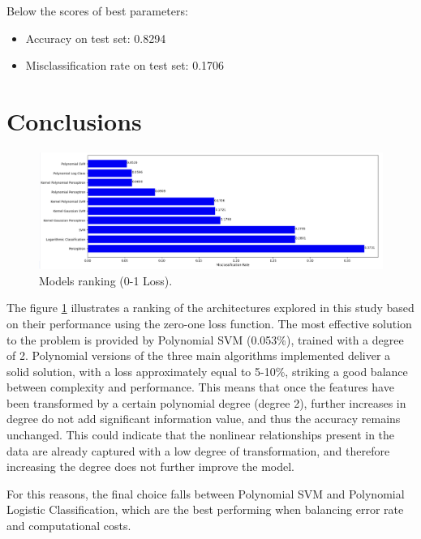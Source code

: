 \documentclass[a4paper, 10pt]{article}
\begin{document}
\noindent Below the scores of best parameters:
\begin{itemize}
    \item Accuracy on test set: 0.8294
    \item Misclassification rate on test set: 0.1706
\end{itemize}


\newpage
\section{Conclusions}

\begin{figure}[H]
    \centering
    \includegraphics[width=1\textwidth]{images/general.png}
    \caption{Models ranking (0-1 Loss).}
    \label{fig:general}
\end{figure}

The figure \ref{fig:general} illustrates a ranking of the architectures explored in this study based on their performance using the zero-one loss function. The most effective solution to the problem is provided by Polynomial SVM (0.053\%), trained with a degree of 2. 
Polynomial versions of the three main algorithms implemented deliver a solid solution, with a loss approximately equal to 5-10\%, striking a good balance between complexity and performance.
This means that once the features have been transformed by a certain polynomial degree (degree 2), further increases in degree do not add significant information value, and thus the accuracy remains unchanged. This could indicate that the nonlinear relationships present in the data are already captured with a low degree of transformation, and therefore increasing the degree does not further improve the model.

For this reasons, the final choice falls between Polynomial SVM and Polynomial Logistic Classification, which are the best performing when balancing error rate and computational costs.
\end{document}
